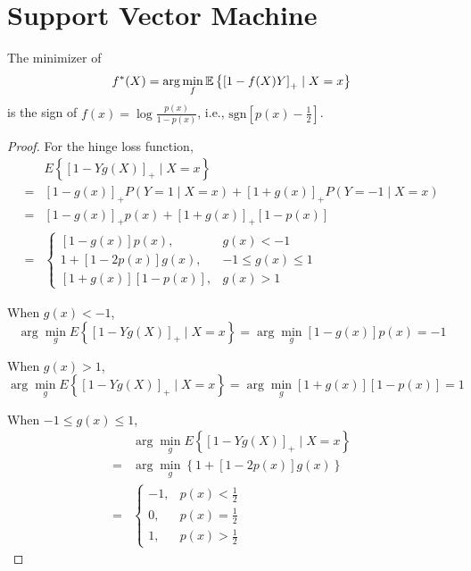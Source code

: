 \chapter{Support Vector Machine}

\begin{theorem}
	The minimizer of
	\begin{equation*}
		f^{*}(X)=\arg\min_{f}{\mathbb E}\left\{\left[1-f(X)Y\right]_{+}\mid X=x\right\}
	\end{equation*}
	is the sign of $f(x)=\log\frac{p(x)}{1-p(x)}$, i.e., $\text{sgn}\left[p(x)-\frac{1}{2}\right]$.
\end{theorem}

\begin{proof}
	For the hinge loss function,
	\begin{equation*}
		\begin{aligned}
			  & E\left\{\left[1-Yg(X)\right]_{+}\mid X=x\right\}                                                   \\
			= & \left[1-g(x)\right]_{+}P\left(Y=1\mid X=x\right)+\left[1+g(x)\right]_{+}P\left(Y=-1\mid X=x\right) \\
			= & \left[1-g(x)\right]_{+}p(x)+\left[1+g(x)\right]_{+}\left[1-p(x)\right]                             \\
			= & \left\{\begin{array}{ll}
				           \left[1-g(x)\right]p(x),                & g(x)<-1           \\
				           1+\left[1-2p(x)\right]g(x),             & -1\leq g(x)\leq 1 \\
				           \left[1+g(x)\right]\left[1-p(x)\right], & g(x)>1
			           \end{array}\right.
		\end{aligned}
	\end{equation*}

	When $g(x)<-1$,
	\begin{equation*}
		\arg\min_{g}E\left\{\left[1-Yg(X)\right]_{+}\mid X=x\right\}=\arg\min_{g}\left[1-g(x)\right]p(x)=-1
	\end{equation*}

	When $g(x)>1$,
	\begin{equation*}
		\arg\min_{g}E\left\{\left[1-Yg(X)\right]_{+}\mid X=x\right\}=\arg\min_{g}\left[1+g(x)\right]\left[1-p(x)\right]=1
	\end{equation*}

	When $-1\leq g(x)\leq 1$,
	\begin{equation*}
		\begin{aligned}
			  & \arg\min_{g}E\left\{\left[1-Yg(X)\right]_{+}\mid X=x\right\} \\
			= & \arg\min_{g}\left\{1+\left[1-2p(x)\right]g(x)\right\}        \\
			= & \left\{\begin{array}{ll}
				           -1, & p(x)<\frac{1}{2} \\
				           0,  & p(x)=\frac{1}{2} \\
				           1,  & p(x)>\frac{1}{2}
			           \end{array}\right.
		\end{aligned}
	\end{equation*}


\end{proof}

